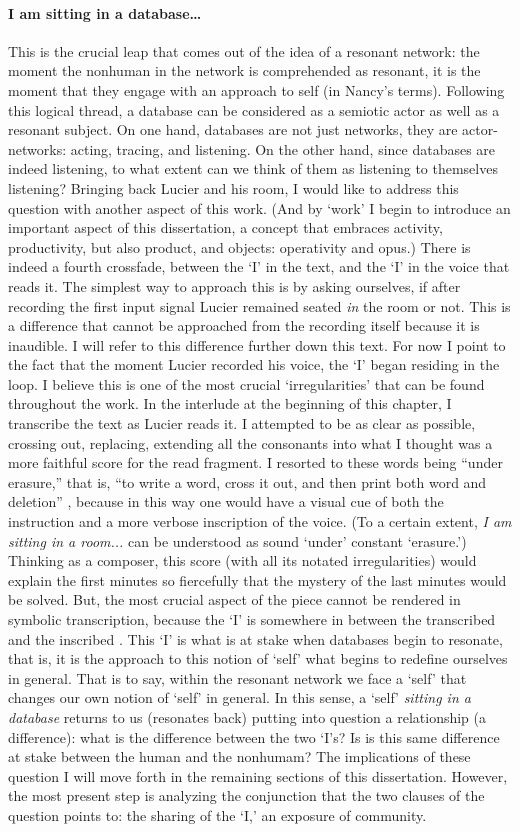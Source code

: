 \paragraph{I am sitting in a database\dots}
This is the crucial leap that comes out of the idea of a resonant network: the moment the nonhuman in the network is comprehended as resonant, it is the moment that they engage with an approach to self (in Nancy's terms). Following this logical thread, a database can be considered as a semiotic actor as well as a resonant subject. On one hand, databases are not just networks, they are actor-networks: acting, tracing, and listening. On the other hand, since databases are indeed listening, to what extent can we think of them as listening to themselves listening? Bringing back Lucier and his room, I would like to address this question with another aspect of this work. (And by `work' I begin to introduce an important aspect of this dissertation, a concept that embraces activity, productivity, but also product, and objects: operativity and opus.) There is indeed a fourth crossfade, between the `I' in the text, and the `I' in the voice that reads it. The simplest way to approach this is by asking ourselves, if after recording the first input signal Lucier remained seated \textit{in} the room or not. This is a difference that cannot be approached from the recording itself because it is inaudible. I will refer to this difference further down this text. For now I point to the fact that the moment Lucier recorded his voice, the `I' began residing in the loop. I believe this is one of the most crucial `irregularities' that can be found throughout the work. In the interlude at the beginning of this chapter, I transcribe the text as Lucier reads it. I attempted to be as clear as possible, crossing out, replacing, extending all the consonants into what I thought was a more faithful score for the read fragment. I resorted to these words being ``under erasure,'' that is, ``to write a word, cross it out, and then print both word and deletion'' \parencite[xiv]{Der76:Of}, because in this way one would have a visual cue of both the instruction and a more verbose inscription of the voice. (To a certain extent, \textit{I am sitting in a room...} can be understood as sound `under' constant `erasure.') Thinking as a composer, this score (with all its notated irregularities) would explain the first minutes so fiercefully that the mystery of the last minutes would be solved. But, the most crucial aspect of the piece cannot be rendered in symbolic transcription, because the `I' is somewhere in between the transcribed and the inscribed . This `I' is what is at stake when databases begin to resonate, that is, it is the approach to this notion of `self' what begins to redefine ourselves in general. That is to say, within the resonant network we face a `self' that changes our own notion of `self' in general. In this sense, a `self' \textit{sitting in a database} returns to us (resonates back) putting into question a relationship (a difference): what is the difference between the two `I's? Is is this same difference at stake between the human and the nonhumam? The implications of these question I will move forth in the remaining sections of this dissertation. However, the most present step is analyzing the conjunction that the two clauses of the question points to: the sharing of the `I,' an exposure of community.

